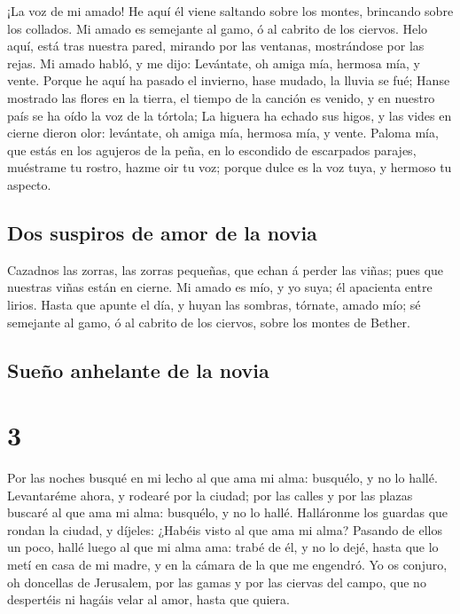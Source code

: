  ¡La voz de mi amado! He aquí él viene saltando sobre los
montes, brincando sobre los collados.  Mi amado es
semejante al gamo, ó al cabrito de los ciervos. Helo aquí, está tras
nuestra pared, mirando por las ventanas, mostrándose por las rejas.
 Mi amado habló, y me dijo: Levántate, oh amiga mía,
hermosa mía, y vente.  Porque he aquí ha pasado el
invierno, hase mudado, la lluvia se fué;  Hanse mostrado
las flores en la tierra, el tiempo de la canción es venido, y en nuestro
país se ha oído la voz de la tórtola;  La higuera ha
echado sus higos, y las vides en cierne dieron olor: levántate, oh amiga
mía, hermosa mía, y vente.  Paloma mía, que estás en los
agujeros de la peña, en lo escondido de escarpados parajes, muéstrame tu
rostro, hazme oir tu voz; porque dulce es la voz tuya, y hermoso tu
aspecto.

\hypertarget{dos-suspiros-de-amor-de-la-novia}{%
\subsection{Dos suspiros de amor de la
novia}\label{dos-suspiros-de-amor-de-la-novia}}

 Cazadnos las zorras, las zorras pequeñas, que echan á
perder las viñas; pues que nuestras viñas están en cierne.
 Mi amado es mío, y yo suya; él apacienta entre lirios.
 Hasta que apunte el día, y huyan las sombras, tórnate,
amado mío; sé semejante al gamo, ó al cabrito de los ciervos, sobre los
montes de Bether.

\hypertarget{sueuxf1o-anhelante-de-la-novia}{%
\subsection{Sueño anhelante de la
novia}\label{sueuxf1o-anhelante-de-la-novia}}

\hypertarget{section-22-3}{%
\section{3}\label{section-22-3}}

 Por las noches busqué en mi lecho al que ama mi alma:
busquélo, y no lo hallé.  Levantaréme ahora, y rodearé por
la ciudad; por las calles y por las plazas buscaré al que ama mi alma:
busquélo, y no lo hallé.  Halláronme los guardas que
rondan la ciudad, y díjeles: ¿Habéis visto al que ama mi alma?
 Pasando de ellos un poco, hallé luego al que mi alma ama:
trabé de él, y no lo dejé, hasta que lo metí en casa de mi madre, y en
la cámara de la que me engendró.  Yo os conjuro, oh
doncellas de Jerusalem, por las gamas y por las ciervas del campo, que
no despertéis ni hagáis velar al amor, hasta que quiera.

